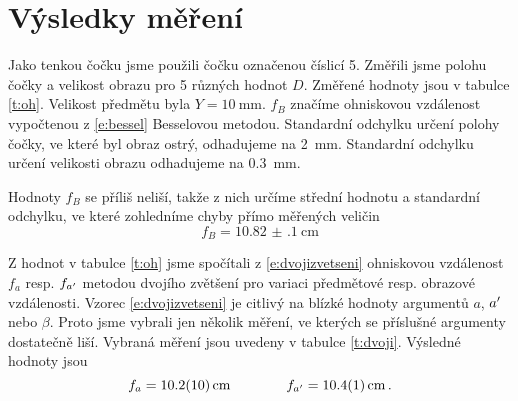 \section*{Výsledky měření}
Jako tenkou čočku jsme použili čočku označenou číslicí 5.
Změřili jsme polohu čočky a velikost obrazu pro 5 různých hodnot $D$. Změřené hodnoty jsou v tabulce \ref{t:oh}. Velikost předmětu byla $Y=\SI{10}{\mm}$. $f_B$ značíme ohniskovou vzdálenost vypočtenou z \eqref{e:bessel} Besselovou metodou.
Standardní odchylku určení polohy čočky, ve které byl obraz ostrý, odhadujeme na \SI{2}{\mm}. Standardní odchylku určení velikosti obrazu odhadujeme na \SI{0.3}{\mm}.

Hodnoty $f_B$ se příliš neliší, takže z nich určíme střední hodnotu a standardní odchylku, ve které zohledníme chyby přímo měřených veličin
\begin{equation*}
f_B=\SI{10.82(10)}{\cm}
\end{equation*}

Z hodnot v tabulce \ref{t:oh} jsme spočítali z \eqref{e:dvojizvetseni} ohniskovou vzdálenost $f_a$ resp. $f_{a^\prime}$ metodou dvojího zvětšení pro variaci předmětové resp. obrazové vzdálenosti. Vzorec \eqref{e:dvojizvetseni} je citlivý na blízké hodnoty argumentů $a$, $a^\prime$ nebo $\beta$. Proto jsme vybrali jen několik měření, ve kterých se příslušné argumenty dostatečně liší. Vybraná měření jsou uvedeny v tabulce \ref{t:dvoji}. Výsledné hodnoty jsou
\begin{equation*}
f_{a} = \SI{10.2(10)}{\cm} \qquad \qquad f_{\apr}=\SI{10.4(1)}{\cm} \,.
\end{equation*}

